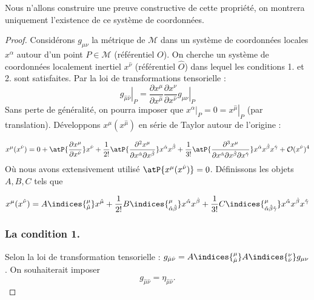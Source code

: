 Nous n'allons construire une preuve constructive de cette propriété, on montrera uniquement l'existence de ce système de coordonnées. 
\begin{proof}
Considérons $g_{\mu \nu}$ la métrique de $\mathcal{M}$ dans un système de coordonnées locales $x^{\alpha}$ autour d'un point $P \in \mathcal{M}$ (référentiel $O$). On cherche un système de coordonnées localement inertiel $x^{\hat{\nu}}$ (référentiel $\hat{O}$) dans lequel les conditions 1. et 2. sont satisfaites. Par la loi de transformations tensorielle : 
\begin{equation}
    \left. g_{\hat{\mu}\hat{\nu}} \right|_P = \frac{\partial x^{\mu}}{\partial x^{\hat{\mu}}}\frac{\partial x^{\nu}}{\partial x^{\hat{\nu}}} \left. g_{\mu \nu} \right|_P
\end{equation}
Sans perte de généralité, on pourra imposer que $\left. x^{\alpha} \right|_P = 0 = \left. x^{\hat{\mu}} \right|_P$ (par translation). Développons $x^\mu (x^{\hat{\mu}})$ en série de Taylor autour de l'origine :

\begin{equation}
    x^{\mu}(x^{\hat{\nu}}) = 0 + \atP{\frac{\partial x^{\mu}}{\partial x^{\hat{\nu}}}}x^{\hat{\nu}} + \frac{1}{2!}\atP{\frac{\partial^2 x^{\mu}}{\partial x^{\hat{\alpha}} \partial x^{\hat{\beta}}}}x^{\hat{\alpha}} x^{\hat{\beta}}+ \frac{1}{3!}\atP{\frac{\partial^3 x^{\mu}}{\partial x^{\hat{\alpha}}\partial x^{\hat{\beta}}\partial x^{\hat{\gamma}}}}x^{\hat{\alpha}}x^{\hat{\beta}}x^{\hat{\gamma}} + \mathcal{O}(x^{\hat{\nu}} )^4
    \label{Taylor d'anciennes à nouvelles coordonnées}
\end{equation}
Où nous avons extensivement utilisé $\atP{x^\mu(x^{\hat{\nu}})} = 0$. Définissons les objets $A,B,C$ tels que

\begin{equation}
    x^{\mu}(x^{\hat{\nu}}) = A\indices{^\mu_{\hat{\mu}}}x^{\hat{\mu}} + \frac{1}{2!}B\indices{^{\mu}_{\hat{\alpha} \hat{\beta}}}x^{\hat{\alpha}}x^{\hat{\beta}} + \frac{1}{3!}C\indices{^{\mu}_{\hat{\alpha}\hat{\beta}\hat{\gamma}}}x^{\hat{\alpha}}x^{\hat{\beta}} x^{\hat{\gamma}}
\end{equation}
\subsubsection{La condition 1.}

Selon la loi de transformation tensorielle : $g_{\hat{\mu}\hat{\nu}} = A\indices{^{\mu}_{\hat{\mu}}} A\indices{^{\nu}_{\hat{\nu}}}g_{\mu \nu}$. On souhaiterait imposer
\begin{equation}
    g_{\hat{\mu}\hat{\nu}} = \eta_{\hat{\mu}\hat{\nu}}.
\end{equation}


\end{proof}
